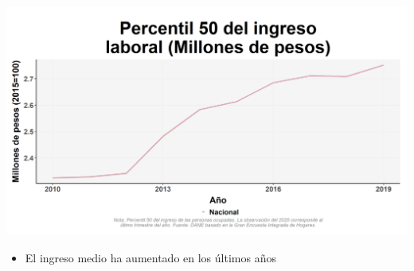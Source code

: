 \documentclass[aspectratio=169]{beamer}
\begin{document}
    \begin{slide}{3} 
                      \begin{imagecolumn}
                      
                    \includegraphics{img/var_17_trend.png}
            \end{imagecolumn}
            \begin{textcolumn}
                \begin{itemize}
                    \item El ingreso medio ha aumentado en los últimos años
                \end{itemize}
            \end{textcolumn}

    \printcolumns
    \end{slide}
\end{document}

